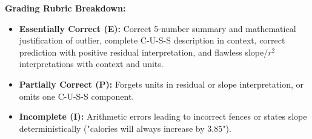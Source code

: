 \begin{frqrubricbox}
\textbf{Grading Rubric Breakdown:}\\
\begin{itemize}
  \item \textbf{Essentially Correct (E):} Correct 5-number summary and mathematical justification of outlier, complete C-U-S-S description in context, correct prediction with positive residual interpretation, and flawless slope/$r^2$ interpretations with context and units.
  \item \textbf{Partially Correct (P):} Forgets units in residual or slope interpretation, or omits one C-U-S-S component.
  \item \textbf{Incomplete (I):} Arithmetic errors leading to incorrect fences or states slope deterministically ("calories will always increase by 3.85").
\end{itemize}
\end{frqrubricbox}

